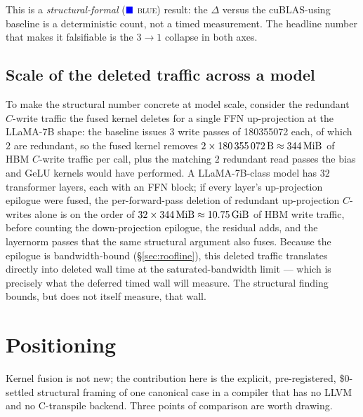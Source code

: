 \documentclass[11pt,a4paper]{article}
\begin{document}
This is a \emph{structural-formal} ($\mathbf{\color{blue}\blacksquare}$
\textsc{blue}) result: the $\Delta$ versus the cuBLAS-using baseline is a
deterministic count, not a timed measurement. The headline number that makes it
falsifiable is the $3\to1$ collapse in both axes.

\subsection{Scale of the deleted traffic across a model}

To make the structural number concrete at model scale, consider the redundant
$C$-write traffic the fused kernel deletes for a single FFN up-projection at
the LLaMA-7B shape: the baseline issues $3$ write passes of
\SI{180355072}{\byte} each, of which $2$ are redundant, so the fused kernel
removes $2 \times \SI{180355072}{\byte} \approx \SI{344}{\mebi\byte}$ of HBM
$C$-write traffic per call, plus the matching $2$ redundant read passes the
bias and GeLU kernels would have performed. A LLaMA-7B-class model has $32$
transformer layers, each with an FFN block; if every layer's up-projection
epilogue were fused, the per-forward-pass deletion of redundant up-projection
$C$-writes alone is on the order of $32 \times \SI{344}{\mebi\byte} \approx
\SI{10.75}{\gibi\byte}$ of HBM write traffic, before counting the
down-projection epilogue, the residual adds, and the layernorm passes that the
same structural argument also fuses. Because the epilogue is bandwidth-bound
(\S\ref{sec:roofline}), this deleted traffic translates directly into deleted
wall time at the saturated-bandwidth limit --- which is precisely what the
deferred timed wall will measure. The structural finding bounds, but does not
itself measure, that wall.

\section{Positioning}
\label{sec:related}

Kernel fusion is not new; the contribution here is the explicit, pre-registered,
\$0-settled structural framing of one canonical case in a compiler that has no
LLVM and no C-transpile backend. Three points of comparison are worth drawing.
\end{document}
